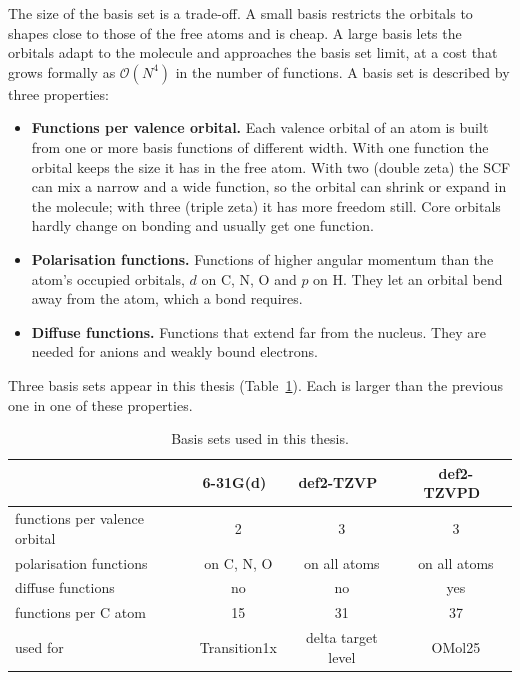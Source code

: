 The size of the basis set is a trade-off. A small basis restricts the
orbitals to shapes close to those of the free atoms and is cheap. A large
basis lets the orbitals adapt to the molecule and approaches the basis set
limit, at a cost that grows formally as $\mathcal{O}(N^4)$ in the number of
functions. A basis set is described by three properties:

\begin{itemize}
  \item \textbf{Functions per valence orbital.} Each valence orbital of
    an atom is built from one or more basis functions of different
    width. With one function the orbital keeps the size it has in the
    free atom. With two (double zeta) the SCF can mix a narrow and a
    wide function, so the orbital can shrink or expand in the molecule;
    with three (triple zeta) it has more freedom still. Core orbitals
    hardly change on bonding and usually get one function.
  \item \textbf{Polarisation functions.} Functions of higher angular
    momentum than the atom's occupied orbitals, $d$ on C, N, O and $p$ on
    H. They let an orbital bend away from the atom, which a bond requires.
  \item \textbf{Diffuse functions.} Functions that extend far from the
    nucleus. They are needed for anions and weakly bound electrons.
\end{itemize}

Three basis sets appear in this thesis (Table~\ref{tab:basis}). Each is
larger than the previous one in one of these properties.

\begin{table}[h]
\centering
\caption{Basis sets used in this thesis.}
\label{tab:basis}
\begin{tabular}{@{}lccc@{}}
\toprule
 & 6-31G(d)~\cite{hariharan1973} & def2-TZVP~\cite{weigend2005} & def2-TZVPD~\cite{rappoport2010} \\
\midrule
functions per valence orbital & 2 & 3 & 3 \\
polarisation functions        & on C, N, O & on all atoms & on all atoms \\
diffuse functions             & no & no & yes \\
functions per C atom          & 15 & 31 & 37 \\
\midrule
used for & Transition1x & delta target level & OMol25 \\
\bottomrule
\end{tabular}
\end{table}

